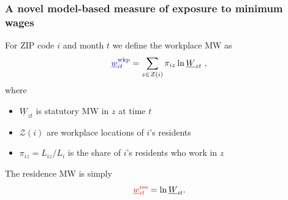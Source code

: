 \documentclass[aspectratio=169, t]{beamer}
\newcommand{\Z}{\mathcal{Z}}
\newcommand{\MW}{\underline{W}}
\newcommand{\mw}{\underline{w}}
\newcommand{\wkp}{\text{wkp}}
\newcommand{\res}{\text{res}}
\begin{document}
\begin{frame}
\frametitle{A novel model-based measure of exposure to minimum wages}

    For ZIP code $i$ and month $t$ we define the {\color{blue} workplace MW} as
    $$
    {\color{blue} \mw^{\wkp}_{it}} = 
    \sum_{z \in \Z(i)} \pi_{i z} \ln \MW_{zt} \ ,
    $$
    where
    \vspace{1mm}
    \begin{itemize} \small
        \item $\MW_{zt}$ is statutory MW in $z$ at time $t$
        \item $\Z(i)$ are workplace locations of $i$'s residents
        \item $\pi_{i z} = L_{i z}/L_i$ is the share of $i$'s residents who work 
        in $z$
    \end{itemize}

    \vspace{4mm}
    The {\color{red} residence MW} is simply
    $$
    {\color{red} \mw^{\res}_{it}} = \ln \MW_{it} .
    $$
\end{frame}
\end{document}
